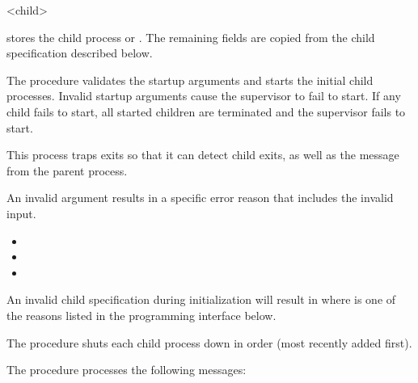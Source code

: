 \begin{tupledef}{<child>}\end{tupledef}\noindent
{}\linebreak {} stores the child process or
. The remaining fields are copied from the child
specification described below.

 The  procedure validates the
startup arguments and starts the initial child processes. Invalid
startup arguments cause the supervisor to fail to start. If any child
fails to start, all started children are terminated and the supervisor
fails to start.

This process traps exits so that it can detect child exits, as well as
the  message from the parent process.

An invalid argument results in a specific error reason that includes
the invalid input.
\antipar
\begin{itemize}
  \item{}
  \item{}
  \item{}
\end{itemize}

An invalid child specification during initialization will result in
 where  is
one of the reasons listed in the programming interface below.

 The  procedure
shuts each child process down in order (most recently added first).

 The  procedure
processes the following messages:

